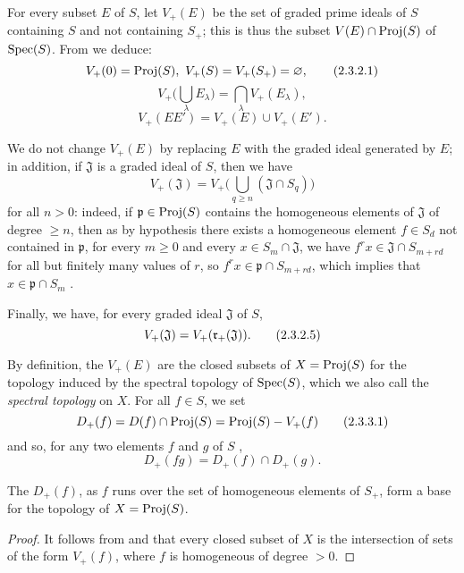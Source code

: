 \begin{env}[2.3.2]
\label{II.2.3.2}
For every subset $E$ of $S$, let $V_+(E)$ be the set of graded prime ideals of $S$ containing $S$ and not containing $S_+$;
this is thus the subset $V(E)\cap\operatorname{Proj}(S)$ of $\operatorname{Spec}(S)$.
From  we deduce:
\[
\label{II.2.3.2.1}
  V_+(0)=\operatorname{Proj}(S),\ V_+(S)=V_+(S_+)=\varnothing,
\tag{2.3.2.1}
\]
\[
\label{II.2.3.2.2}
  V_+\big(\textstyle\bigcup_\lambda E_\lambda\big)=\textstyle\bigcap_\lambda V_+(E_\lambda),
\tag{2.3.2.2}
\]
\[
\label{II.2.3.2.3}
  V_+(EE')=V_+(E)\cup V_+(E').
\tag{2.3.2.3}
\]

We do not change $V_+(E)$ by replacing $E$ with the graded ideal generated by $E$;
in addition, if $\mathfrak{J}$ is a graded ideal of $S$, then we have
\[
  V_+(\mathfrak{J})=V_+\big(\textstyle\bigcup_{q\geq n}(\mathfrak{J}\cap S_q)\big)
\tag{2.3.2.4}
\]
for all $n>0$: indeed, if $\mathfrak{p}\in\operatorname{Proj}(S)$ contains the homogeneous elements of $\mathfrak{J}$ of degree $\geq n$, then as by hypothesis there exists a homogeneous element $f\in S_d$ not contained in $\mathfrak{p}$, for every $m\geq 0$ and every $x\in S_m\cap\mathfrak{J}$, we have $f^r x\in\mathfrak{J}\cap S_{m+rd}$ for all but finitely many values of $r$, so $f^r x\in\mathfrak{p}\cap S_{m+rd}$, which implies that $x\in\mathfrak{p}\cap S_m$ .

Finally, we have, for every graded ideal $\mathfrak{J}$ of $S$,
\[
  V_+(\mathfrak{J})=V_+(\mathfrak{r}_+(\mathfrak{J})).
\tag{2.3.2.5}
\]
\end{env}

\begin{env}[2.3.3]
\label{II.2.3.3}
By definition, the $V_+(E)$ are the closed subsets of $X=\operatorname{Proj}(S)$ for the topology induced by the spectral topology of $\operatorname{Spec}(S)$, which we also call the \emph{spectral topology} on $X$.
For all $f\in S$, we set
\[
\label{II.2.3.3.1}
  D_+(f) = D(f)\cap\operatorname{Proj}(S) = \operatorname{Proj}(S)- V_+(f)
\tag{2.3.3.1}
\]
and so, for any two elements $f$ and $g$ of $S$ ,
\[
\label{II.2.3.3.2}
  D_+(fg) = D_+(f)\cap D_+(g).
\tag{2.3.3.2}
\]
\end{env}

\begin{proposition}[2.3.4]
\label{II.2.3.4}
The $D_+(f)$, as $f$ runs over the set of homogeneous elements of $S_+$, form a base for the topology of $X=\operatorname{Proj}(S)$.
\end{proposition}

\begin{proof}
It follows from  and  that every closed subset of $X$ is the intersection of sets of the form $V_+(f)$, where $f$ is homogeneous of degree $>0$.
\end{proof}

